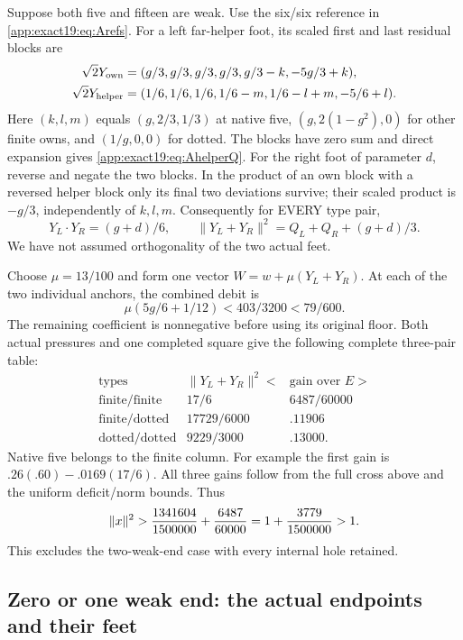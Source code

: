 Suppose both five and fifteen
are weak.
Use the six/six reference in
\eqref{app:exact19:eq:Arefs}.
For a left far-helper foot,
its scaled first and last residual
blocks are
\[
\begin{split}
 \sqrt2Y_{\rm own}&=(g/3,g/3,g/3,g/3,g/3-k,-5g/3+k),\\
 \sqrt2Y_{\rm helper}&=(1/6,1/6,1/6,1/6-m,1/6-l+m,-5/6+l).
\end{split}
\]
Here \((k,l,m)\) equals
\((g,2/3,1/3)\) at native five,
\((g,2(1-g^2),0)\) for other finite
owns, and \((1/g,0,0)\) for dotted.
The blocks have zero sum and
direct expansion gives
\eqref{app:exact19:eq:AhelperQ}.
For the right foot of parameter
\(d\), reverse and negate the two
blocks.
In the product of an own block
with a reversed helper block only
its final two deviations survive;
their scaled product is \(-g/3\),
independently of \(k,l,m\).
Consequently for EVERY type pair,
\[
 Y_L\cdot Y_R=(g+d)/6,\qquad
          \|Y_L+Y_R\|^2=Q_L+Q_R+(g+d)/3 .
\]
We have not assumed orthogonality
of the two actual feet.

Choose \(\mu=13/100\) and form
one vector \(W=w+\mu(Y_L+Y_R)\).
At each of the two individual
anchors, the combined debit is
\[
           \mu(5g/6+1/12)
               <403/3200<79/600 .
\]
The remaining coefficient is
nonnegative before using its
original floor.
Both actual pressures and one
completed square give the following
complete three-pair table:
\[
\begin{array}{c|c|c}
 \text{types}&\|Y_L+Y_R\|^2<&\text{gain over }E>\\ \hline
 \text{finite/finite}&17/6&6487/60000\\
 \text{finite/dotted}&17729/6000&.11906\\
 \text{dotted/dotted}&9229/3000&.13000 .
\end{array}
\]
Native five belongs to the finite
column.
For example the first gain is
\(.26(.60)-.0169(17/6)\).
All three gains follow from the
full cross above and the uniform
deficit/norm bounds.
Thus
\[
            \|x\|^2>
               {1341604\over1500000}+{6487\over60000}
                     =1+{3779\over1500000}>1 .
\]
This excludes the two-weak-end case
with every internal hole retained.

\subsection{Zero or one weak end: the actual endpoints and their feet}
\label{app:exact19:Aactualends}

